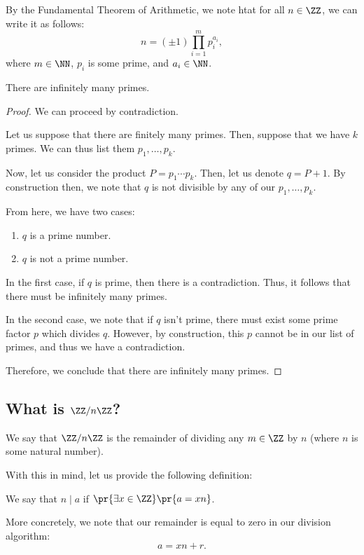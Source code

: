 \documentclass[openany]{book}
\begin{document}
By the Fundamental Theorem of Arithmetic, we note htat for all $n \in \ZZ$, we can write it as follows:
\begin{equation*}
	n = (\pm 1) \prod_{i=1}^{m} p_i^{a_i},
\end{equation*}
where $m \in \NN$, $p_i$ is some prime, and $a_i \in \NN$.

\begin{thm}
	There are infinitely many primes.
\end{thm}
\begin{proof}
	We can proceed by contradiction.
	
	Let us suppose that there are finitely many primes. Then, suppose that we have $k$ primes. We can thus list them $p_1, \ldots, p_k$.
	
	Now, let us consider the product $P = p_1 \cdots p_k$. Then, let us denote $q = P + 1$. By construction then, we note that $q$ is not divisible by any of our $p_1, \ldots, p_k$.
	
	From here, we have two cases:
	\begin{enumerate}
		\item $q$ is a prime number.
		\item $q$ is not a prime number.
	\end{enumerate}

	In the first case, if $q$ is prime, then there is a contradiction. Thus, it follows that there must be infinitely many primes.
	
	In the second case, we note that if $q$ isn't prime, there must exist some prime factor $p$ which divides $q$. However, by construction, this $p$ cannot be in our list of primes, and thus we have a contradiction.
	
	Therefore, we conclude that there are infinitely many primes.
\end{proof}

\subsection{What is $\ZZ / n \ZZ$?}
We say that $\ZZ / n \ZZ$ is the remainder of dividing any $m \in \ZZ$ by $n$ (where $n$ is some natural number).

With this in mind, let us provide the following definition:
\begin{defn}[Divides By]
	We say that $n \mid a$ if $\pr{\exists x \in \ZZ}\pr{a = xn}$.
	
	More concretely, we note that our remainder is equal to zero in our division algorithm:
	\begin{equation*}
		a = xn + r.
	\end{equation*}
\end{defn}
\end{document}
